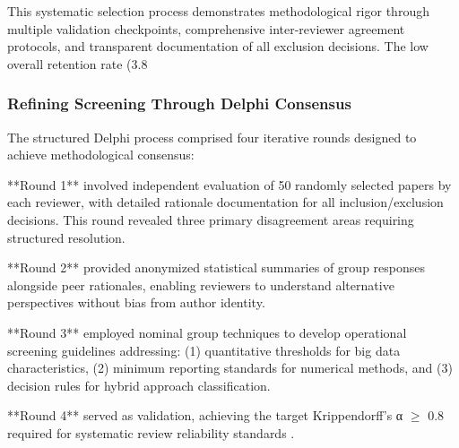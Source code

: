 \documentclass[acmsmall]{acmart}
\begin{document}
This systematic selection process demonstrates methodological rigor through multiple validation checkpoints, comprehensive inter-reviewer agreement protocols, and transparent documentation of all exclusion decisions. The low overall retention rate (3.8%

\subsubsection{Refining Screening Through Delphi Consensus}\label{subsubsec:phase-2-literature-search-and-study-selection:refining-screening-through-delphi-consensus}

The structured Delphi process comprised four iterative rounds designed to achieve methodological consensus:

**Round 1** involved independent evaluation of 50 randomly selected papers by each reviewer, with detailed rationale documentation for all inclusion/exclusion decisions. This round revealed three primary disagreement areas requiring structured resolution.

**Round 2** provided anonymized statistical summaries of group responses alongside peer rationales, enabling reviewers to understand alternative perspectives without bias from author identity.

**Round 3** employed nominal group techniques \citep{delbecq1971group} to develop operational screening guidelines addressing: (1) quantitative thresholds for big data characteristics, (2) minimum reporting standards for numerical methods, and (3) decision rules for hybrid approach classification.

**Round 4** served as validation, achieving the target Krippendorff's α $\geq$ 0.8 required for systematic review reliability standards \citep{krippendorff2018content}.
\end{document}
